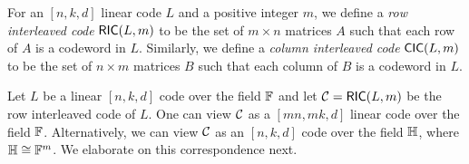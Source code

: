 \begin{definition}\label{defn:interleavedcode}
For an $[n,k,d]$ linear code $L$ and a positive integer $m$, we define a {\em row interleaved code} $\mathsf{RIC}(L,m)$ to be the set of $m\times n$ matrices $A$ such that each row of $A$ is a codeword in $L$. Similarly, we define a {\em column interleaved code} $\mathsf{CIC}(L,m)$ to be the set of $n\times m$ matrices $B$ such that each column of $B$ is a codeword in $L$.
\end{definition}

Let $L$ be a linear $[n,k,d]$ code over the field $\mathbb{F}$ and let
$\mathcal{C}=\mathsf{RIC}(L,m)$ be the row interleaved code of $L$. One can view $\mathcal{C}$ as
a $[mn,mk,d]$ linear code over the field $\mathbb{F}$. Alternatively, we can view
$\mathcal{C}$ as an $[n,k,d]$ code over the field $\mathbb{H}$, where $\mathbb{H}\cong \mathbb{F}^m$. We
elaborate on this correspondence next.

